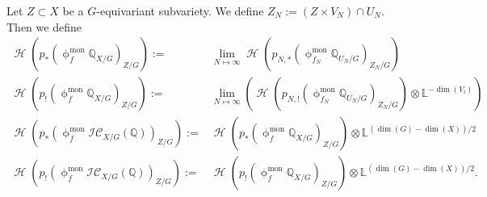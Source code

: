 \documentclass[a4paper,10pt]{amsart}
\newcommand{\ICS}{\mathcal{IC}}
\newcommand{\phim}[1]{\phi^{\mon}_{#1}}
\renewcommand{\phi}{\upphi}
\DeclareMathOperator{\mon}{mon}
\DeclareMathOperator{\Ho}{\mathcal{H}}
\begin{document}
Let $Z\subset X$ be a $G$-equivariant subvariety.  We define $Z_N:=(Z\times V_N)\cap U_N$.  Then we define 
\begin{align*}
\Ho\left(p_*\left(\phim{f}\mathbb{Q}_{X/G}\right)_{Z/G}\right):=&\lim_{N\mapsto \infty}\Ho\left(p_{N,*}\left(\phim{f_N}\mathbb{Q}_{U_N/G}\right)_{Z_N/G}\right)\\
\Ho\left(p_!\left(\phim{f}\mathbb{Q}_{X/G}\right)_{Z/G}\right):=&\lim_{N\mapsto \infty}\left(\Ho\left(p_{N,!}\left(\phim{f_N}\mathbb{Q}_{U_N/G}\right)_{Z_N/G}\right)\otimes \mathbb{L}^{-\dim(V_i)}\right)\\
\Ho\left(p_*\left(\phim{f}\ICS_{X/G}(\mathbb{Q})\right)_{Z/G}\right):=&\Ho\left(p_*\left(\phim{f}\mathbb{Q}_{X/G}\right)_{Z/G}\right)\otimes\mathbb{L}^{(\dim(G)-\dim(X))/2}\\
\Ho\left(p_!\left(\phim{f}\ICS_{X/G}(\mathbb{Q})\right)_{Z/G}\right):=&\Ho\left(p_!\left(\phim{f}\mathbb{Q}_{X/G}\right)_{Z/G}\right)\otimes\mathbb{L}^{(\dim(G)-\dim(X))/2}.
\end{align*}
\end{document}
